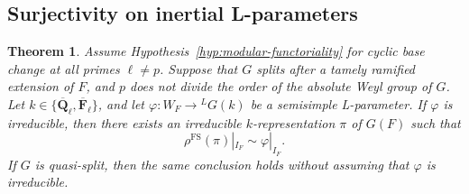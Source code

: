 \documentclass[reqno]{amsart}
\numberwithin{equation}{subsection}
\newcommand{\F}{\mathbf{F}}
\newcommand{\Q}{\mathbf{Q}}
\newcommand{\ol}[1]{\overline{#1}}
\newcommand{\co}{\colon}
\newcommand{\ld}{{}^L}
\DeclareMathOperator{\FS}{FS}
\newtheorem{thm}{Theorem}[subsection]
\theoremstyle{remark}
\numberwithin{equation}{subsection}
\numberwithin{figure}{subsection}
\begin{document}
\subsection{Surjectivity on inertial L-parameters}



\begin{thm}\label{thm:inertial-surjectivity}
Assume Hypothesis~\ref{hyp:modular-functoriality} for cyclic base change at all primes $\ell \neq p$.
Suppose that $G$ splits after a tamely ramified extension of $F$, and $p$ does not divide the order of the absolute Weyl group of $G$. Let $k \in \{\ol\Q_\ell, \ol\F_\ell\}$, and let $\varphi\co W_F \to \ld G(k)$ be a semisimple L-parameter. If $\varphi$ is irreducible, then there exists an irreducible $k$-representation $\pi$ of $G(F)$ such that
\begin{equation}\label{eq:inertial-param}
\rho^{\FS}(\pi)|_{I_F} \sim \varphi|_{I_F}.
\end{equation}
If $G$ is quasi-split, then the same conclusion holds without assuming that $\varphi$ is irreducible.
\end{thm}
\end{document}
